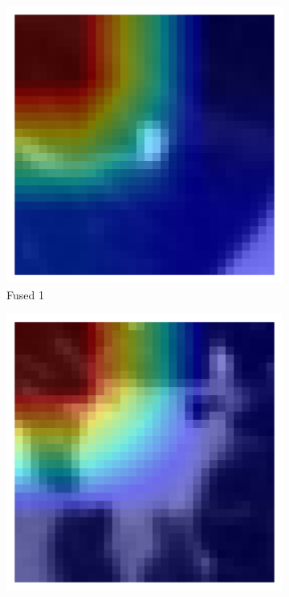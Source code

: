 \begin{figure}[htbp]
    \begin{subfigure}[b]{0.18\textwidth}
        \centering
        \includegraphics[width=\linewidth]{figures/heatmaps/ex1/sample_gradcam.png}
        \caption*{Fused 1}
    \end{subfigure}
    \begin{subfigure}[b]{0.18\textwidth}
        \centering
        \includegraphics[width=\linewidth]{figures/heatmaps/ex2/sample_gradcam.png}

\end{subfigure}
\end{figure}
